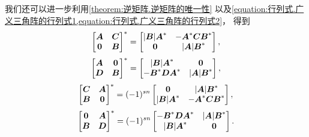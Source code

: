 \begin{remark}
我们还可以进一步利用\cref{theorem:逆矩阵.逆矩阵的唯一性}
以及\cref{equation:行列式.广义三角阵的行列式1,equation:行列式.广义三角阵的行列式2}，
得到\[
	\begin{bmatrix}
		\boldsymbol{A} & \boldsymbol{C} \\
		\boldsymbol0 & \boldsymbol{B}
	\end{bmatrix}^*
	= \begin{bmatrix}
		\abs{\boldsymbol{B}} \boldsymbol{A}^* & -\boldsymbol{A}^*\boldsymbol{C}\boldsymbol{B}^* \\
		\boldsymbol0 & \abs{\boldsymbol{A}} \boldsymbol{B}^*
	\end{bmatrix},
\]\[
	\begin{bmatrix}
		\boldsymbol{A} & \boldsymbol0 \\
		\boldsymbol{D} & \boldsymbol{B}
	\end{bmatrix}^*
	= \begin{bmatrix}
		\abs{\boldsymbol{B}} \boldsymbol{A}^* & \boldsymbol0 \\
		-\boldsymbol{B}^* \boldsymbol{D} \boldsymbol{A}^* & \abs{\boldsymbol{A}} \boldsymbol{B}^*
	\end{bmatrix},
\]\[
	\begin{bmatrix}
		\boldsymbol{C} & \boldsymbol{A} \\
		\boldsymbol{B} & \boldsymbol0
	\end{bmatrix}^*
	= (-1)^{sn} \begin{bmatrix}
		\boldsymbol0 & \abs{\boldsymbol{A}} \boldsymbol{B}^* \\
		\abs{\boldsymbol{B}} \boldsymbol{A}^* & -\boldsymbol{A}^*\boldsymbol{C}\boldsymbol{B}^*
	\end{bmatrix},
\]\[
	\begin{bmatrix}
		\boldsymbol0 & \boldsymbol{A} \\
		\boldsymbol{B} & \boldsymbol{D}
	\end{bmatrix}^*
	= (-1)^{sn} \begin{bmatrix}
		-\boldsymbol{B}^*\boldsymbol{D}\boldsymbol{A}^* & \abs{\boldsymbol{A}} \boldsymbol{B}^* \\
		\abs{\boldsymbol{B}} \boldsymbol{A}^* & \boldsymbol0
	\end{bmatrix}.
\]
\end{remark}
